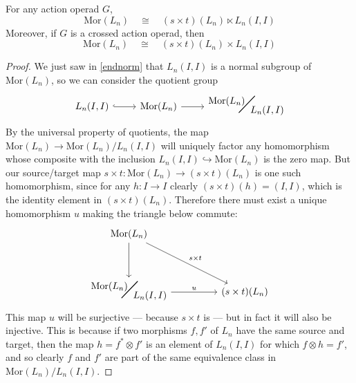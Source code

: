 \documentclass{amsbook} %
\newcommand{\bigquotient}[2]{ \raisebox{0.75\height}{$#1$} \mkern-12mu\scalebox{2}{$\diagup$}\mkern-10mu \raisebox{-0.5\height}{$#2$} }
\numberwithin{section}{chapter}
\begin{document}
%
% 
\begin{prop} \label{morprod} For any action operad $G$,
\[ \mathrm{Mor}(L_n) \quad \cong \quad (s \times t)(L_n) \ltimes L_n(I,I) \]
Moreover, if $G$ is a crossed action operad, then
\[ \mathrm{Mor}(L_n) \quad \cong \quad (s \times t)(L_n) \times L_n(I,I) \]
\end{prop}
\begin{proof}
We just saw in \cref{endnorm} that $L_n(I,I)$ is a normal subgroup of $\mathrm{Mor}(L_n)$, so we can consider the quotient group
\[ \begin{tikzcd}
L_n(I,I) \ar[r, hookrightarrow] & \mathrm{Mor}(L_n) \ar[r] & \bigquotient{\mathrm{Mor}(L_n)}{L_n(I,I)}
\end{tikzcd} \]
By the universal property of quotients, the map $\mathrm{Mor}(L_n) \to \mathrm{Mor}(L_n) / L_n(I,I)$ will uniquely factor any homomorphism whose composite with the inclusion $L_n(I,I) \hookrightarrow \mathrm{Mor}(L_n)$ is the zero map. But our source/target map $s \times t : \mathrm{Mor}(L_n) \to (s \times t)(L_n)$ is one such homomorphism, since for any $h: I \to I$ clearly $(s \times t)(h) = (I, I)$, which is the identity element in $(s \times t)(L_n)$. Therefore there must exist a unique homomorphism $u$ making the triangle below commute:
\[ \begin{tikzcd}
\mathrm{Mor}(L_n) \ar[dd] \ar[ddrr, "s \times t"] & & \\
& & \\
\bigquotient{\mathrm{Mor}(L_n)}{L_n(I,I)} \ar[rr, "u"] & & (s \times t)(L_n)
\end{tikzcd} \]
This map $u$ will be surjective --- because $s \times t$ is --- but in fact it will also be injective. This is because if two morphisms $f, f'$ of $L_n$ have the same source and target, then the map $h = f^* \otimes f'$ is an element of $L_n(I,I)$ for which $f \otimes h = f'$, and so clearly $f$ and $f'$ are part of the same equivalence class in $\mathrm{Mor}(L_n)/L_n(I,I)$. 

\end{proof}
\end{document}
